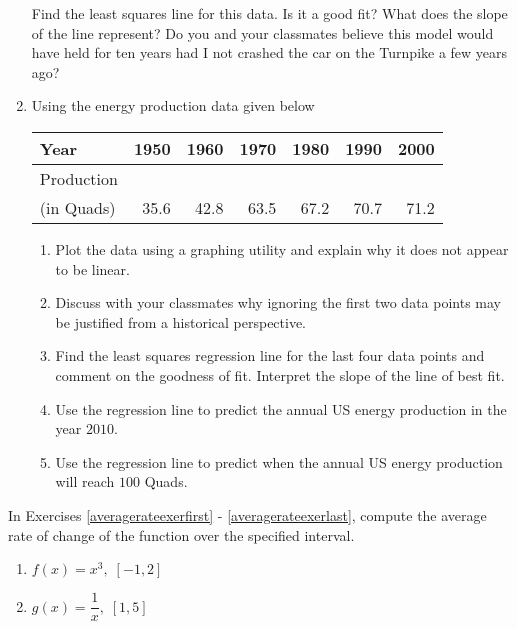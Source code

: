 \begin{enumerate}
\normalsize

\medskip

\noindent Find the least squares line for this data.  Is it a good fit?  What does the slope of the line represent?  Do you and your classmates believe this model would have held for ten years had I not crashed the car on the Turnpike a few years ago?


\item Using the energy production data given below

\noindent \begin{tabular}{|l|r|r|r|r|r|r|} \hline
Year & 1950 & 1960 & 1970 & 1980 & 1990 & 2000 \\ 
\hline 
Production & & & & & & \\
(in Quads) & 35.6 & 42.8 & 63.5 & 67.2 & 70.7 & 71.2 \\ \hline
\end{tabular}

\begin{enumerate}

\item  Plot the data using a graphing utility and explain why it does not appear to be linear.

\item  Discuss with your classmates why ignoring the first two data points may be justified from a historical perspective.  

\item Find the least squares regression line for the last four data points and comment on the goodness of fit. Interpret the slope of the line of best fit.

\item  Use the regression line to predict the annual US energy production in the year $2010$.

\item  Use the regression line to predict when the annual US energy production will reach $100$ Quads.

\end{enumerate}



\setcounter{HW}{\value{enumi}}
\end{enumerate}


In Exercises \ref{averagerateexerfirst} - \ref{averagerateexerlast}, compute the average rate of change of the  function over the specified interval.

\begin{multicols}{2}
\begin{enumerate}
\setcounter{enumi}{\value{HW}}

\item $f(x) = x^{3}, \; [-1, 2]$  \label{averagerateexerfirst}
\item $g(x) = \dfrac{1}{x}, \; [1, 5]$

\setcounter{HW}{\value{enumi}}
\end{enumerate}
\end{multicols}

